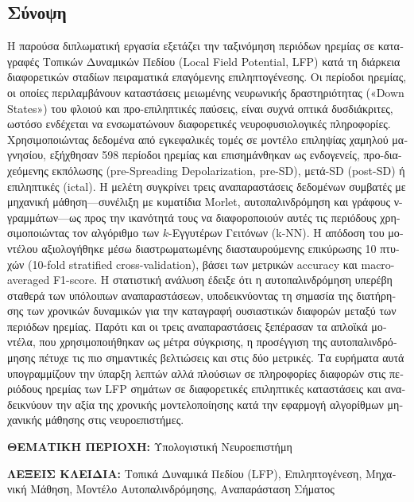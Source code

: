 \documentclass{article}
\begin{document}
\begin{greek}
\begin{center}
	\section*{Σύνοψη}
\end{center}
	\noindent
	Η παρούσα διπλωματική εργασία εξετάζει την ταξινόμηση περιόδων ηρεμίας σε καταγραφές Τοπικών Δυναμικών Πεδίου (Local Field Potential, LFP) κατά τη διάρκεια διαφορετικών σταδίων πειραματικά επαγόμενης επιληπτογένεσης. Οι περίοδοι ηρεμίας, οι οποίες περιλαμβάνουν καταστάσεις μειωμένης νευρωνικής δραστηριότητας («Down States») του φλοιού και προ-επιληπτικές παύσεις, είναι συχνά οπτικά δυσδιάκριτες, ωστόσο ενδέχεται να ενσωματώνουν διαφορετικές νευροφυσιολογικές πληροφορίες. Χρησιμοποιώντας δεδομένα από εγκεφαλικές τομές σε μοντέλο επιληψίας χαμηλού μαγνησίου, εξήχθησαν 598 περίοδοι ηρεμίας και επισημάνθηκαν ως ενδογενείς, προ-διαχεόμενης εκπόλωσης (pre-Spreading Depolarization, pre-SD), μετά-SD (post-SD) ή επιληπτικές (ictal). Η μελέτη συγκρίνει τρεις αναπαραστάσεις δεδομένων συμβατές με μηχανική μάθηση—συνέλιξη με κυματίδια Morlet, αυτοπαλινδρόμηση και γράφους ν-γραμμάτων—ως προς την ικανότητά τους να διαφοροποιούν αυτές τις περιόδους χρησιμοποιώντας τον αλγόριθμο των $k$-Εγγυτέρων Γειτόνων (k-NN). Η απόδοση του μοντέλου αξιολογήθηκε μέσω διαστρωματωμένης διασταυρούμενης επικύρωσης 10 πτυχών (10-fold stratified cross-validation), βάσει των μετρικών accuracy και macro-averaged F1-score. Η στατιστική ανάλυση έδειξε ότι η αυτοπαλινδρόμηση υπερέβη σταθερά των υπόλοιπων αναπαραστάσεων, υποδεικνύοντας τη σημασία της διατήρησης των χρονικών δυναμικών για την καταγραφή ουσιαστικών διαφορών μεταξύ των περιόδων ηρεμίας. Παρότι και οι τρεις αναπαραστάσεις ξεπέρασαν τα απλοϊκά μοντέλα, που χρησιμοποιήθηκαν ως μέτρα σύγκρισης, η προσέγγιση της αυτοπαλινδρόμησης πέτυχε τις πιο σημαντικές βελτιώσεις και στις δύο μετρικές. Τα ευρήματα αυτά υπογραμμίζουν την ύπαρξη λεπτών αλλά πλούσιων σε πληροφορίες διαφορών στις περιόδους ηρεμίας των LFP σημάτων σε διαφορετικές επιληπτικές καταστάσεις και αναδεικνύουν την αξία της χρονικής μοντελοποίησης κατά την εφαρμογή αλγορίθμων μηχανικής μάθησης στις νευροεπιστήμες.

\vfill

\noindent
\textbf{ΘΕΜΑΤΙΚΗ ΠΕΡΙΟΧΗ:} Υπολογιστική Νευροεπιστήμη

\vspace{0.5em}

\noindent
\textbf{ΛΕΞΕΙΣ ΚΛΕΙΔΙΑ:} Τοπικά Δυναμικά Πεδίου (LFP), Επιληπτογένεση, Μηχανική Μάθηση, Μοντέλο Αυτοπαλινδρόμησης, Αναπαράσταση Σήματος
\end{greek}
\newpage
\end{document}

